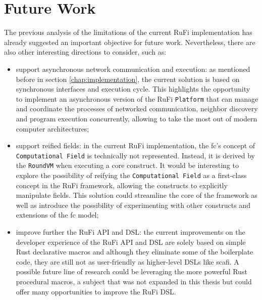 \section{Future Work}
The previous analysis of the limitations of the current RuFi implementation has already suggested an important objective for future work.
Nevertheless, there are also other interesting directions to consider, such as:

\begin{itemize}
      \item support asynchronous network communication and execution: as mentioned before in section \ref{chap:implementation}, the current solution is based on synchronous interfaces and execution cycle. This highlights the opportunity to implement an asynchronous
            version of the RuFi \texttt{Platform} that can manage and coordinate the processes of networked communication, neighbor discovery and program execution concurrently, allowing to take the most out of modern computer architectures;
      \item support reified fields: in the current RuFi implementation, the \ac{fc}'s concept of \texttt{Computational Field} is technically not represented. Instead, it is derived by the \texttt{RoundVM} when executing a core construct. It would be interesting to explore the
            possibility of reifying the \texttt{Computational Field} as a first-class concept in the RuFi framework, allowing the constructs to explicitly manipulate fields. This solution could streamline the core of the framework as well as
            introduce the possibility of experimenting with other constructs and extensions of the \ac{fc} model;
      \item improve further the RuFi API and DSL: the current improvements on the developer experience of the RuFi API and DSL are solely based on simple Rust declarative macros and although they eliminate
            some of the boilerplate code, they are still not as user-friendly as higher-level DSLs like \ac{scafi}. A possible future line of research could be leveraging the more powerful Rust procedural macros, a subject that was not expanded in this thesis
            but could offer many opportunities to improve the RuFi DSL.
\end{itemize}
